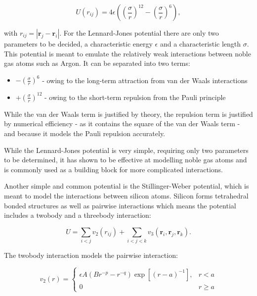 $$ U(r_{ij}) = 4\epsilon \left(\left(\frac{\sigma}{r}\right)^{12}
    - \left(\frac{\sigma}{r}\right)^{6}\right) , $$

with $r_{ij} = \left| \bm{r}_j - \bm{r}_i \right|$.
For the Lennard-Jones potential there are only two parameters to be decided,
a characteristic energy $\epsilon$ and a characteristic length $\sigma$.
This potential is meant to emulate the relatively weak interactions
between noble gas atoms such as Argon.
It can be separated into two terms:

\begin{itemize}
    \item $\mathrel{-} \left(\frac{\sigma}{r}\right)^6$ - owing to the long-term
        attraction from van der Waals interactions
    \item $\mathrel{+} \left(\frac{\sigma}{r}\right)^{12}$ - owing to the short-term repulsion
        from the Pauli principle
\end{itemize}

While the van der Waals term is justified by theory, the repulsion term
is justified by numerical efficiency - as it contains the square of the van der Waals
term - and because it models the Pauli repulsion accurately.
\par
While the Lennard-Jones potential is very simple, requiring only two parameters
to be determined, it has shown to be effective at modelling noble gas atoms
and is commonly used as a building block for more complicated interactions.
\par
[cite \url{http://www.pages.drexel.edu/~cfa22/msim/node41.html}]
Another simple and common potential is the Stillinger-Weber potential,
which is meant to model the interactions between silicon atoms.
Silicon forms tetrahedral bonded structures as well as pairwise interactions
which means the potential includes a twobody and a threebody interaction:

\begin{equation}
    U = \sum_{i < j} v_2(r_{ij}) + \sum_{i < j < k} v_3(\bm{r}_i, \bm{r}_j, \bm{r}_k) .
\end{equation}

The twobody interaction models the pairwise interaction:

\begin{equation}
    v_2(r) =
    \begin{cases}
        \epsilon A (Br^{-p} - r^{-q}) \exp \left[ (r - a)^{-1} \right], 
        & r < a \\
        0 & r \geq a
    \end{cases}
\end{equation}

